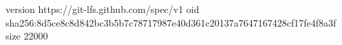 version https://git-lfs.github.com/spec/v1
oid sha256:8d5ce8c8d842bc3b5b7c78717987e40d361c20137a7647167428cf17fe4f8a3f
size 22000
